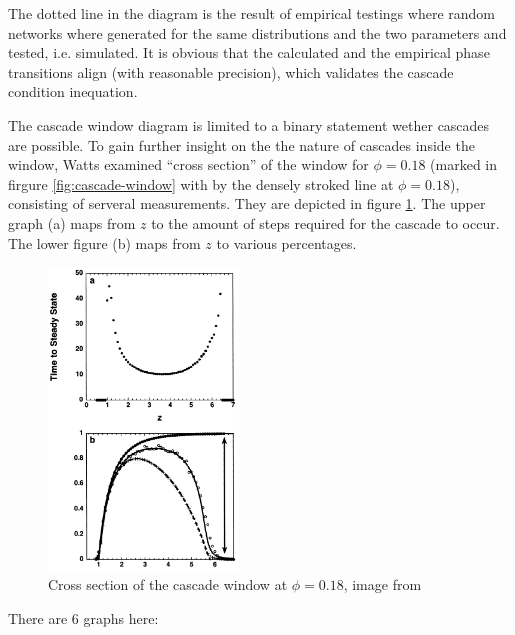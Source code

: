 \documentclass{sig-alternate-05-2015}
\begin{document}
The dotted line in the diagram is the result of empirical testings where random networks where generated for the same distributions and the two parameters and tested, i.e. simulated. It is obvious that the calculated and the empirical phase transitions align (with reasonable precision), which validates the cascade condition inequation.

The cascade window diagram is limited to a binary statement wether cascades are possible. To gain further insight on the the nature of cascades inside the window, Watts examined ``cross section'' of the window for $\phi=0.18$ (marked in firgure \ref{fig:cascade-window} with by the densely stroked line at $\phi=0.18$), consisting of serveral measurements. They are depicted in figure \ref{fig:cross-section}. The upper graph (a) maps from $z$ to the amount of steps required for the cascade to occur. The lower figure (b) maps from $z$ to various percentages.

\begin{figure}[h!]
  \centering
  \includegraphics[width=0.45\textwidth]{img/cross-section.png}
  \caption{Cross section of the cascade window at $\phi=0.18$, image from \cite{simplemodel}}
  \label{fig:cross-section}
\end{figure}

There are 6 graphs here:
\end{document}
